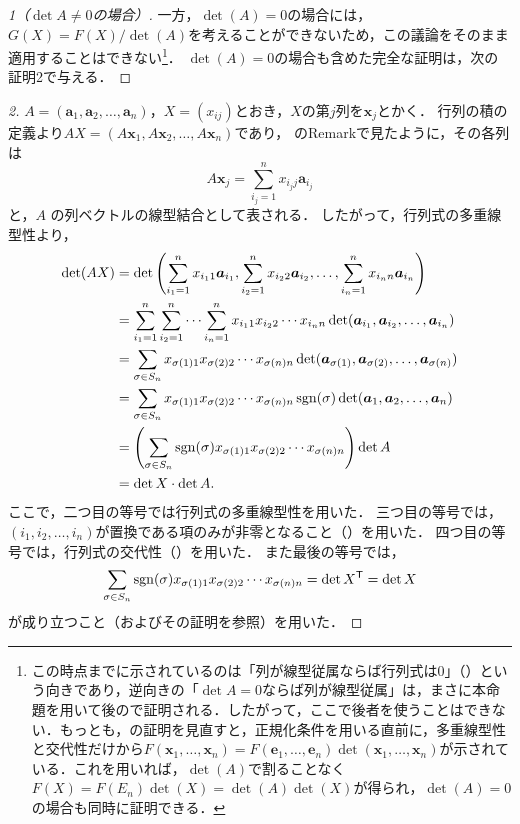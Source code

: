 \begin{tleftbar}
\begin{proof}[1（$\det A \ne 0$の場合）]
  \smallskip
  一方，$\det(A)=0$の場合には，$G(X)=F(X)/\det(A)$を考えることができないため，この議論をそのまま適用することはできない\footnote{この時点までに示されているのは「列が線型従属ならば行列式は$0$」（）という向きであり，逆向きの「$\det A = 0$ならば列が線型従属」は，まさに本命題を用いて後ので証明される．したがって，ここで後者を使うことはできない．もっとも，の証明を見直すと，正規化条件を用いる直前に，多重線型性と交代性だけから$F(\bm{x}_1, \dots, \bm{x}_n) = F(\bm{e}_1, \dots, \bm{e}_n) \det(\bm{x}_1, \dots, \bm{x}_n)$が示されている．これを用いれば，$\det(A)$で割ることなく$F(X) = F(E_n)\det(X) = \det(A)\det(X)$が得られ，$\det(A) = 0$の場合も同時に証明できる．}．
  $\det(A)=0$の場合も含めた完全な証明は，次の証明2で与える．
\end{proof}
\end{tleftbar}


\begin{tleftbar}
\begin{proof}[2]
  $A=(\bm{a}_1,\bm{a}_2,\dots,\bm{a}_n)$，$X=(x_{ij})$とおき，$X$の第$j$列を$\bm{x}_j$とかく．
  行列の積の定義より$AX=(A\bm{x}_1,A\bm{x}_2,\dots,A\bm{x}_n)$であり，
  のRemarkで見たように，その各列は
  \[
    A\bm{x}_j=\sum_{i_j=1}^{n} x_{i_j j}\bm{a}_{i_j}
  \]
  と，$A$ の列ベクトルの線型結合として表される．
  したがって，行列式の多重線型性より，
  \begin{align*}
    \det(AX)
    &=
    \det\left(
      \sum_{i_1=1}^{n} x_{i_1 1}\bm{a}_{i_1},
      \sum_{i_2=1}^{n} x_{i_2 2}\bm{a}_{i_2},
      \dots,
      \sum_{i_n=1}^{n} x_{i_n n}\bm{a}_{i_n}
    \right) \\
    &=
    \sum_{i_1=1}^{n}\sum_{i_2=1}^{n}\dotsm\sum_{i_n=1}^{n}
    x_{i_1 1}x_{i_2 2}\dotsm x_{i_n n}
    \det(\bm{a}_{i_1},\bm{a}_{i_2},\dots,\bm{a}_{i_n}) \\
    &=
    \sum_{\sigma\in S_n}
    x_{\sigma(1)1}x_{\sigma(2)2}\dotsm x_{\sigma(n)n}
    \det(\bm{a}_{\sigma(1)},\bm{a}_{\sigma(2)},\dots,\bm{a}_{\sigma(n)}) \\
    &=
    \sum_{\sigma\in S_n}
    x_{\sigma(1)1}x_{\sigma(2)2}\dotsm x_{\sigma(n)n}
    \sgn(\sigma)\det(\bm{a}_1,\bm{a}_2,\dots,\bm{a}_n) \\
    &=
    \left(
      \sum_{\sigma\in S_n}
      \sgn(\sigma)
      x_{\sigma(1)1}x_{\sigma(2)2}\dotsm x_{\sigma(n)n}
    \right)\det A \\
    &=
    \det X \cdot \det A.
  \end{align*}
  ここで，二つ目の等号では行列式の多重線型性を用いた．
  三つ目の等号では，$(i_1,i_2,\dots,i_n)$が置換である項のみが非零となること（）を用いた．
  四つ目の等号では，行列式の交代性（）を用いた．
  また最後の等号では，
  \[
    \sum_{\sigma\in S_n}\sgn(\sigma)x_{\sigma(1)1}x_{\sigma(2)2}\dotsm x_{\sigma(n)n}
    =\det X^{\mathsf{T}}=\det X
  \]
  が成り立つこと（およびその証明を参照）を用いた．
\end{proof}
\end{tleftbar}

